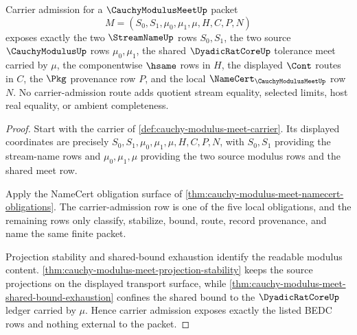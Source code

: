 \begin{theorem}\label{thm:cauchy-modulus-meet-shared-radius-carrier-admission}
Carrier admission for a $\CauchyModulusMeetUp$ packet
$$
M=(S_0,S_1,\mu_0,\mu_1,\mu,H,C,P,N)
$$
exposes exactly the two $\StreamNameUp$ rows $S_0,S_1$, the two source $\CauchyModulusUp$ rows $\mu_0,\mu_1$, the shared $\DyadicRatCoreUp$ tolerance meet carried by $\mu$, the componentwise $\hsame$ rows in $H$, the displayed $\Cont$ routes in $C$, the $\Pkg$ provenance row $P$, and the local $\NameCert_{\CauchyModulusMeetUp}$ row $N$. No carrier-admission route adds quotient stream equality, selected limits, host real equality, or ambient completeness.
\end{theorem}
\begin{proof}
Start with the carrier of \autoref{def:cauchy-modulus-meet-carrier}. Its displayed coordinates are precisely $S_0,S_1,\mu_0,\mu_1,\mu,H,C,P,N$, with $S_0,S_1$ providing the stream-name rows and $\mu_0,\mu_1,\mu$ providing the two source modulus rows and the shared meet row.

Apply the NameCert obligation surface of \autoref{thm:cauchy-modulus-meet-namecert-obligations}. The carrier-admission row is one of the five local obligations, and the remaining rows only classify, stabilize, bound, route, record provenance, and name the same finite packet.

Projection stability and shared-bound exhaustion identify the readable modulus content. \autoref{thm:cauchy-modulus-meet-projection-stability} keeps the source projections on the displayed transport surface, while \autoref{thm:cauchy-modulus-meet-shared-bound-exhaustion} confines the shared bound to the $\DyadicRatCoreUp$ ledger carried by $\mu$. Hence carrier admission exposes exactly the listed BEDC rows and nothing external to the packet.
\end{proof}

